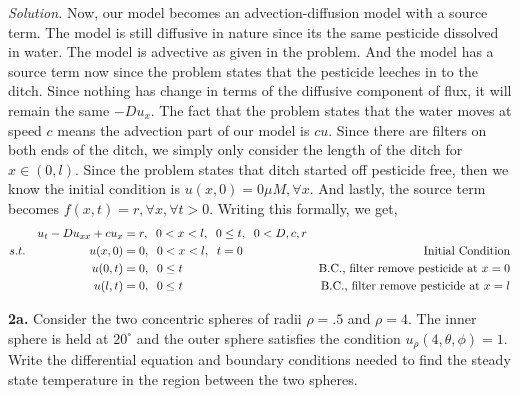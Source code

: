 \documentclass{article}
\begin{document}
\vspace{3mm}
\textit{Solution.}  Now, our model becomes an advection-diffusion model with a source term. The model is still diffusive in nature since its the same pesticide dissolved in water. The model is advective as given in the problem. And the model has a source term now since the problem states that the pesticide leeches in to the ditch. Since nothing has change in terms of the diffusive component of flux, it will remain the same \(-Du_{x}\). The fact that the problem states that the water moves at speed \(c\) means the advection part of our model is \(cu\).  Since there are filters on both ends of the ditch, we simply only consider the length of the ditch for \( x \in (0,l)\). Since the problem states that ditch started off pesticide free, then we know the initial condition is \( u(x,0) = 0 \mu\! M,  \forall x \). And lastly, the source term becomes \( f(x,t) = r , \forall x, \forall t>0 \). Writing this formally, we get, 
\begin{align*}
&& u_t -Du_{xx} +cu_x&= r, \hspace{2mm} 0<x<l, \hspace{2mm} 0 \leq t, \hspace{2mm}0< D,c,r&     &     \\
 s.t.& &       u(x,0) &= 0, \hspace{2mm}0<x<l, \hspace{2mm} t=0     &    \text{Initial Condition} &         \\
 & &        u(0,t)&=0, \hspace{2mm} 0\leq t           &\text{B.C., filter remove pesticide at }x=0            &         \\
 & &        u(l,t)&=0, \hspace{2mm} 0\leq t                 &   \text{B.C., filter remove pesticide at }x=l         &               
\end{align*}





\newpage
\textbf{2a.} Consider the two concentric spheres of radii \( \rho=.5\) and \( \rho=4\). The inner sphere is held at \(20^{\circ}\) and the outer sphere satisfies the condition \(u_\rho (4,\theta, \phi)=1\). Write the differential equation and boundary conditions needed to find the steady state temperature in the region between the two spheres. 
\end{document}
